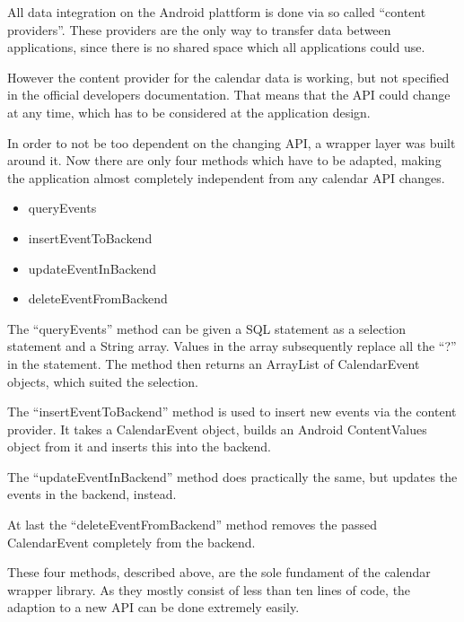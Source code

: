 All data integration on the Android plattform is done via
so called ``content providers''. These providers are the
only way to transfer data between applications, since there
is no shared space which all applications could use.

However the content provider for the calendar data is
working, but not specified in the official developers
documentation. That means that the API could change at
any time, which has to be considered at the application
design.

In order to not be too dependent on the changing API, a
wrapper layer was built around it. Now there are only four
methods which have to be adapted, making the application almost completely
independent from any calendar API changes.

\begin{itemize}
  \item queryEvents
  \item insertEventToBackend
  \item updateEventInBackend
  \item deleteEventFromBackend
\end{itemize}

The ``queryEvents'' method can be given a SQL statement as a selection
statement and a String array. Values in the array subsequently replace all
the ``?'' in the statement. The method then returns an ArrayList of
CalendarEvent objects, which suited the selection.

The ``insertEventToBackend'' method is used to insert new events via the
content provider. It takes a CalendarEvent object, builds an Android
ContentValues object from it and inserts this into the backend.

The ``updateEventInBackend'' method does practically the same, but updates
the events in the backend, instead.

At last the ``deleteEventFromBackend'' method removes the passed CalendarEvent
completely from the backend.

These four methods, described above, are the sole fundament of the calendar
wrapper library. As they mostly consist of less than ten lines of code,
the adaption to a new API can be done extremely easily.
